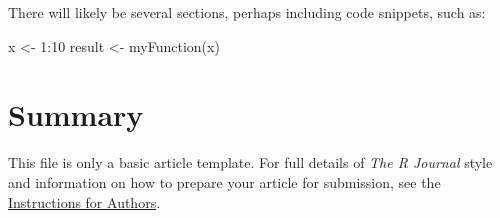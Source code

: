 There will likely be several sections, perhaps including code snippets, such as:

\begin{example}
  x <- 1:10
  result <- myFunction(x)
\end{example}

\section{Summary}

This file is only a basic article template. For full details of \emph{The R Journal} style and information on how to prepare your article for submission, see the \href{https://journal.r-project.org/share/author-guide.pdf}{Instructions for Authors}.



\address{Jaros\l{}aw Chilmoniuk\\
  Affiliation\\
  Address\\
  Country\\
  (ORCiD if desired)\\
  }

\address{Madeleine Ruhe\\
  Brandenburg University of Technology Cottbus - Senftenberg\\
  Universit\"atsplatz 1, Senftenberg\\
  Germany\\
  (ORCiD if desired)\\
  }

\address{Stefan R\"{o}diger\\
  Brandenburg University of Technology Cottbus - Senftenberg\\
  Universit\"atsplatz 1, Senftenberg\\
  Germany\\
  (ORCiD: 0000-0002-1441-6512)\\
  }

\address{Micha\l{} Burdukiewicz\\
  Affiliation\\
  Address\\
  Country\\
  (ORCiD: 0000-0001-8926-582X)\\
  }
